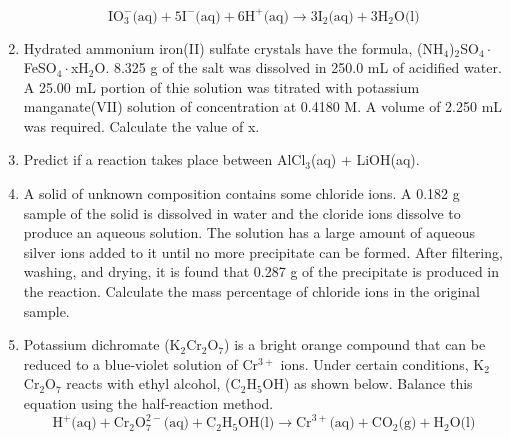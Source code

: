 \documentclass[../chem.tex]{subfiles}
\begin{document}
\begin{enumerate}
    \[\text{IO}_3^-\text{(aq)}+5\text{I}^-\text{(aq)}+6\text{H}^+\text{(aq)}\rightarrow 3\text{I}_2\text{(aq)}+3\text{H}_2\text{O(l)}\]
    \item Hydrated ammonium iron(II) sulfate crystals have the formula, (NH$_4$)$_2$SO$_4\cdot$FeSO$_4\cdot$xH$_2$O. 8.325 g of the salt was dissolved in 250.0 mL of acidified water. A 25.00 mL portion of thie solution was titrated with potassium manganate(VII) solution of concentration at 0.4180 M. A volume of 2.250 mL was required. Calculate the value of x.
    \item Predict if a reaction takes place between AlCl$_3$(aq) + LiOH(aq). 
    \item A solid of unknown composition contains some chloride ions. A 0.182 g sample of the solid is dissolved in water and the cloride ions dissolve to produce an aqueous solution. The solution has a large amount of aqueous silver ions added to it until no more precipitate can be formed. After filtering, washing, and drying, it is found that 0.287 g of the precipitate is produced in the reaction. Calculate the mass percentage of chloride ions in the original sample.
    \item Potassium dichromate (K$_2$Cr$_2$O$_7$) is a bright orange compound that can be reduced to a blue-violet solution of Cr$^{3+}$ ions. Under certain conditions, K$_2$Cr$_2$O$_7$ reacts with ethyl alcohol, (C$_2$H$_5$OH) as shown below. Balance this equation using the half-reaction method.
    \[\text{H}^+\text{(aq)}+\text{Cr}_2\text{O}_7^{2-}\text{(aq)}+\text{C}_2\text{H}_5\text{OH(l)}\rightarrow \text{Cr}^{3+}\text{(aq)}+\text{CO}_2\text{(g)}+\text{H}_2\text{O(l)}\]
\end{enumerate}
\end{document}
